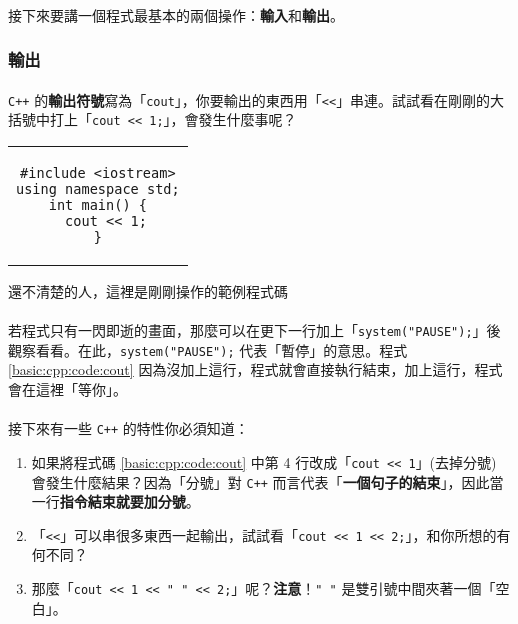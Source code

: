 \documentclass[12pt,a4paper,oneside]{article}
\begin{document}
\begin{CJK}{UTF8}{bkai}
\paragraph{}接下來要講一個程式最基本的兩個操作：\textbf{輸入}和\textbf{輸出}。

\subsubsection{輸出}

\paragraph{}\texttt{C++} 的\textbf{輸出符號}寫為「\lstinline!cout!」，你要輸出的東西用「\lstinline!<<!」串連。試試看在剛剛的大括號中打上「\lstinline!cout << 1;!」，會發生什麼事呢？

\begin{code}[h!]
\centering
\begin{tabular}{c}
\begin{lstlisting}
#include <iostream>
using namespace std;
int main() {
  cout << 1;
}
\end{lstlisting}
\end{tabular}
\caption{還不清楚的人，這裡是剛剛操作的範例程式碼}
\label{basic:cpp:code:cout}
\end{code}

\paragraph{}若程式只有一閃即逝的畫面，那麼可以在更下一行加上「\lstinline!system("PAUSE");!」後觀察看看。在此，\lstinline!system("PAUSE");! 代表「暫停」的意思。程式 \ref{basic:cpp:code:cout} 因為沒加上這行，程式就會直接執行結束，加上這行，程式會在這裡「等你」。
\paragraph{}接下來有一些 \texttt{C++} 的特性你必須知道：

\begin{enumerate}
\item 如果將程式碼 \ref{basic:cpp:code:cout} 中第 4 行改成「\lstinline!cout << 1!」(去掉分號) 會發生什麼結果？因為「分號」對 \texttt{C++} 而言代表「\textbf{一個句子的結束}」，因此當一行\textbf{指令結束就要加分號}。
\item 「\lstinline!<<!」可以串很多東西一起輸出，試試看「\lstinline!cout << 1 << 2;!」，和你所想的有何不同？
\item 那麼「\lstinline!cout << 1 << " " << 2;!」呢？{\color{blue}\textbf{注意}}！\lstinline!" "! 是雙引號中間夾著一個「空白」。
\end{enumerate}


\end{CJK}
\end{document}
